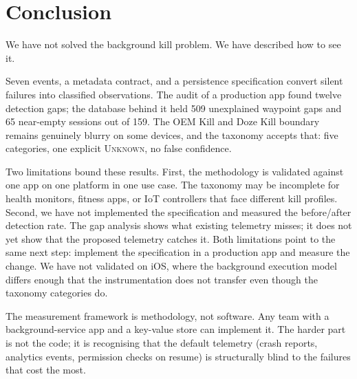 \documentclass[10pt,journal,compsoc]{IEEEtran}
\begin{document}

\section{Conclusion}
\label{sec:conclusion}

We have not solved the background kill problem. We have described how to
see it.

Seven events, a metadata contract, and a persistence specification
convert silent failures into classified observations. The audit of a
production app found twelve detection gaps; the database behind it held
509 unexplained waypoint gaps and 65 near-empty sessions out of 159. The
OEM Kill and Doze Kill boundary remains genuinely blurry on some devices,
and the taxonomy accepts that: five categories, one explicit
\textsc{Unknown}, no false confidence.

Two limitations bound these results. First, the methodology is validated
against one app on one platform in one use case. The taxonomy may be
incomplete for health monitors, fitness apps, or IoT controllers that
face different kill profiles. Second, we have not implemented the
specification and measured the before/after detection rate. The gap
analysis shows what existing telemetry misses; it does not yet show that
the proposed telemetry catches it. Both limitations point to the same
next step: implement the specification in a production app and measure
the change. We have not validated on iOS, where the background execution
model differs enough that the instrumentation does not transfer even
though the taxonomy categories do.

The measurement framework is methodology, not software. Any team with
a background-service app and a key-value store can implement it. The
harder part is not the code; it is recognising that the default
telemetry (crash reports, analytics events, permission checks on resume)
is structurally blind to the failures that cost the most.




\end{document}
